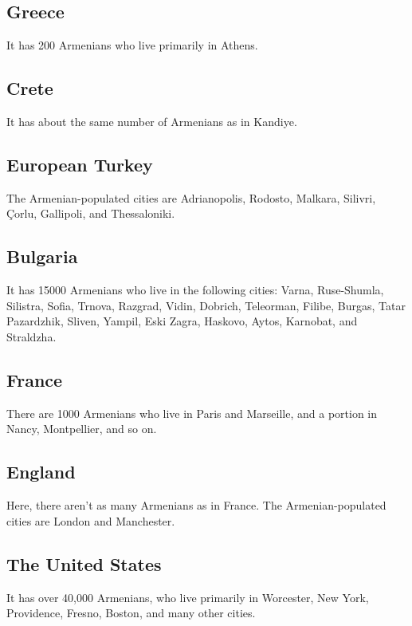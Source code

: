 \subsection{Greece}

It has 200 Armenians who live primarily in Athens.

\subsection{Crete}


It has about the same number of Armenians as in Kandiye. 

\subsection{European Turkey}

The Armenian-populated cities are Adrianopolis, Rodosto, Malkara, Silivri, Çorlu, Gallipoli, and Thessaloniki.

\subsection{Bulgaria}

It has 15000 Armenians who live in the following cities: Varna, Ruse-Shumla, Silistra, Sofia, Trnova, Razgrad, Vidin, Dobrich, Teleorman, Filibe, Burgas, Tatar Pazardzhik, Sliven, Yampil, Eski Zagra, Haskovo, Aytos, Karnobat, and Straldzha. 

\subsection{France}

There are 1000 Armenians who live in Paris and Marseille, and a portion in Nancy, Montpellier, and so on.

\subsection{England}

Here, there aren't as many Armenians as in France. The Armenian-populated cities are London and Manchester. 

\subsection{The United States}

It has over 40,000 Armenians, who live primarily in Worcester, New York, Providence, Fresno, Boston, and many other cities.

